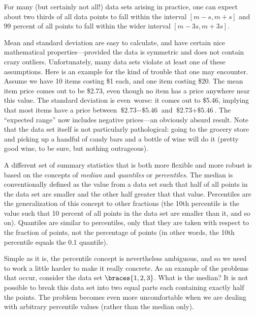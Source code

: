 For many (but certainly not all!) data sets arising in practice, one
can expect about two thirds of all data points to fall within the
interval $[m-s, m+s]$ and 99 percent of all points to fall within the
wider interval $[m-3s, m+3s]$.

Mean and standard deviation are easy to calculate, and have certain
nice mathematical properties---provided the data is symmetric and does
not contain crazy outliers. Unfortunately, many data sets violate at
least one of these assumptions. Here is an example for the kind of
trouble that one may encounter. Assume we have 10 items costing \$1
each, and one item costing \$20. The mean item price comes out to be
\$2.73, even though no item has a price anywhere near this value. The
standard deviation is even~worse: it comes out to \$5.46, implying
that most items have a price between $\text{\$2.73}-\text{\$5.46}$ and
$\text{\$2.73}+\text{\$5.46}$. The ``expected range'' now includes
negative prices---an obviously absurd result. Note that the data set
itself is not particularly pathological: going to the grocery store
and picking up a handful of candy bars and a bottle of wine will do it
(pretty good wine, to be sure, but nothing outrageous).

A different set of summary statistics that is both more flexible and
more robust is based on the concepts of \emph{median} and
\emph{quantiles} or \emph{percentiles}. The median is conventionally
defined as the value from a data set such that half of all points in
the data set are smaller and the other half greater that that value.
Percentiles are the generalization of this concept to other fractions
(the 10th percentile is the value such that 10 percent of all points
in the data set are smaller than it, and so on).  Quantiles are
similar to percentiles, only that they are taken with respect to the
fraction of points, not the percentage of points (in other words, the
10th percentile equals the 0.1 quantile).

Simple as it is, the percentile concept is nevertheless ambiguous, and
so we need to work a little harder to make it really concrete. As an
example of the problems that occur, consider the data set $\braces{ 1,
  2, 3 }$. What is the median?\vadjust{\pagebreak} It is not possible to break this data
set into two equal parts each containing exactly half the points. The
problem becomes even more uncomfortable when we are dealing with
arbitrary percentile values (rather than the median only).

